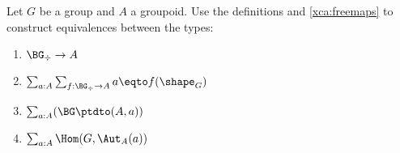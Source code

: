 

\begin{xca}\label{xca:BGtotype}
  Let $G$ be a group and $A$ a groupoid.  Use the definitions and
  \cref{xca:freemaps} to construct equivalences between the types:
  \begin{enumerate}
  \item $\BG_\div\to A$
  \item $\sum_{a:A}\sum_{f:\BG_\div \to A}a \eqto f(\shape_G)$
  \item $\sum_{a:A}(\BG\ptdto(A,a))$
  \item $\sum_{a:A}\Hom(G,\Aut_A(a))$\qedhere
  \end{enumerate}
\end{xca}

